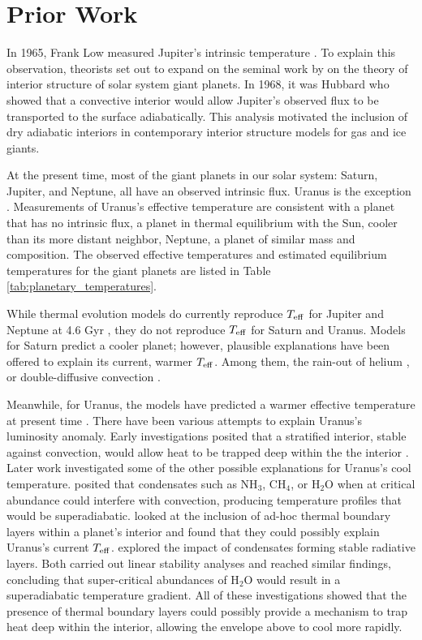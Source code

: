 \documentclass[11pt]{ucscthesisbs}
\begin{document}
\section{Prior Work}
In 1965, Frank Low measured Jupiter's intrinsic temperature \citep{low_1966}. To explain this observation, theorists \citep{hubbard_1968, smoluchowski_1967,hubbard_1977, hubbard_1977_2, podolak_1991} set out to expand on the seminal work by \citep{demarcus_1958} on the theory of interior structure of solar system giant planets. In 1968, it was Hubbard who showed that a convective interior would allow Jupiter's observed flux to be transported to the surface adiabatically. This analysis motivated the inclusion of dry adiabatic interiors in contemporary interior structure models for gas and ice giants.

At the present time, most of the giant planets in our solar system: Saturn, Jupiter, and Neptune, all have an observed intrinsic flux. Uranus is the exception \citep{pearl_conrath_1991}. Measurements of Uranus's effective temperature are consistent with a planet that has no intrinsic flux, a planet in thermal equilibrium with the Sun, cooler than its more distant neighbor, Neptune, a planet of similar mass and composition. The observed effective temperatures and estimated equilibrium temperatures for the giant planets are listed in Table \ref{tab:planetary_temperatures}. 

While thermal evolution models do currently reproduce $T_{\rm eff}$ for Jupiter and Neptune at 4.6 Gyr \citep{graboske_1975,fortney_2011}, they do not reproduce $T_{\rm eff}$ for Saturn and Uranus. Models for Saturn predict a cooler planet; however, plausible explanations have been offered to explain its current, warmer $T_{\rm eff}$. Among them, the rain-out of helium \citep{fortney_hubbard_2003, mankovich_2020}, or double-diffusive convection \citep{leconte_chabrier_2013}. 

Meanwhile, for Uranus, the models have predicted a warmer effective temperature at present time \citep{fortney_2011, podolak_1991, hubbard_1995, scheibe_2019}. There have been various attempts to explain Uranus's luminosity anomaly. Early investigations posited that a stratified interior, stable against convection, would allow heat to be trapped deep within the the interior \citep{podolak_1991}. Later work investigated some of the other possible explanations for Uranus's cool temperature. \citep{guillot_1995} posited that condensates such as NH$_{3}$, CH$_{4}$, or H$_{2}$O when at critical abundance could interfere with convection, producing temperature profiles that would be superadiabatic. \citep{nettelmann_2016} looked at the inclusion of ad-hoc thermal boundary layers within a planet's interior and found that they could possibly explain Uranus's current $T_{\rm eff}$. \citep{friedson_2017,leconte_2017} explored the impact of condensates forming stable radiative layers. Both carried out linear stability analyses and reached similar findings, concluding that super-critical abundances of H$_{2}$O would result in a superadiabatic temperature gradient. All of these investigations showed that the presence of thermal boundary layers could possibly provide a mechanism to trap heat deep within the interior, allowing the envelope above to cool more rapidly.
\end{document}
